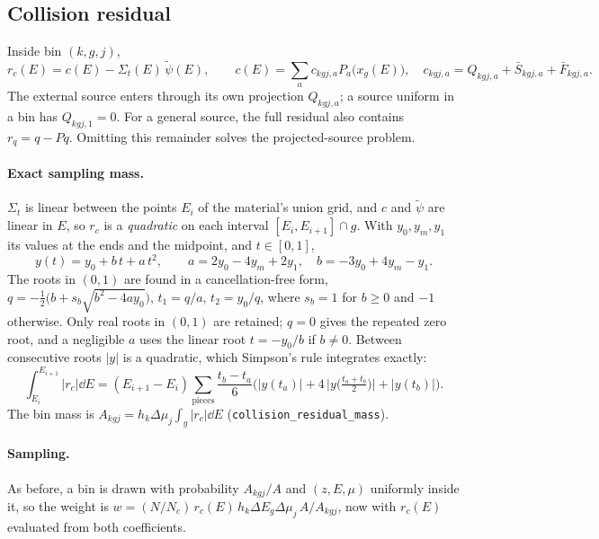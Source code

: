 \documentclass[11pt]{article}
\newcommand{\tpsi}{\tilde\psi}
\newcommand{\Sbar}{\bar S}
\newcommand{\Sigt}{\Sigma_t}
\begin{document}
\subsection{Collision residual}

Inside bin $(k,g,j)$,
\begin{equation}
  r_c(E) = c(E) - \Sigt(E)\,\tpsi(E),\qquad
  c(E) = \sum_a c_{kgj,a}P_a\big(x_g(E)\big),\quad
  c_{kgj,a} = Q_{kgj,a} + \Sbar_{kgj,a} + \bar F_{kgj,a}.
\end{equation}
The external source enters through its own projection $Q_{kgj,a}$; a source uniform
in a bin has $Q_{kgj,1}=0$. For a general source, the full residual also contains
$r_q=q-Pq$. Omitting this remainder solves the projected-source problem.

\paragraph{Exact sampling mass.} $\Sigt$ is linear between the points $E_i$ of the
material's union grid, and $c$ and $\tpsi$ are linear in $E$, so $r_c$ is a
\emph{quadratic} on each interval $[E_i,E_{i+1}]\cap g$. With
$y_0, y_m, y_1$ its values at the ends and the midpoint, and $t\in[0,1]$,
\begin{equation}
  y(t) = y_0 + b\,t + a\,t^2,\qquad a = 2y_0-4y_m+2y_1,\quad b = -3y_0+4y_m-y_1 .
\end{equation}
The roots in $(0,1)$ are found in a cancellation-free form,
$q=-\tfrac12\big(b+s_b\sqrt{b^2-4ay_0}\big)$, $t_1=q/a$,
$t_2=y_0/q$, where $s_b=1$ for $b\ge0$ and $-1$ otherwise. Only real roots in
$(0,1)$ are retained; $q=0$ gives the repeated zero root, and a negligible $a$
uses the linear root $t=-y_0/b$ if $b\ne0$. Between consecutive roots $|y|$
is a quadratic, which Simpson's rule integrates exactly:
\begin{equation}
  \int_{E_i}^{E_{i+1}}|r_c|\dd E = (E_{i+1}-E_i)\sum_{\text{pieces}}
  \frac{t_b-t_a}{6}\Big(|y(t_a)| + 4\,\big|y\big(\tfrac{t_a+t_b}{2}\big)\big| + |y(t_b)|\Big).
\end{equation}
The bin mass is $A_{kgj} = h_k\Delta\mu_j\int_g|r_c|\dd E$
(\texttt{collision\_residual\_mass}).

\paragraph{Sampling.} As before, a bin is drawn with probability $A_{kgj}/A$ and
$(z,E,\mu)$ uniformly inside it, so the weight is
$w = (N/N_c)\,r_c(E)\,h_k\Delta E_g\Delta\mu_j\,A/A_{kgj}$, now with $r_c(E)$
evaluated from both coefficients.
\end{document}
